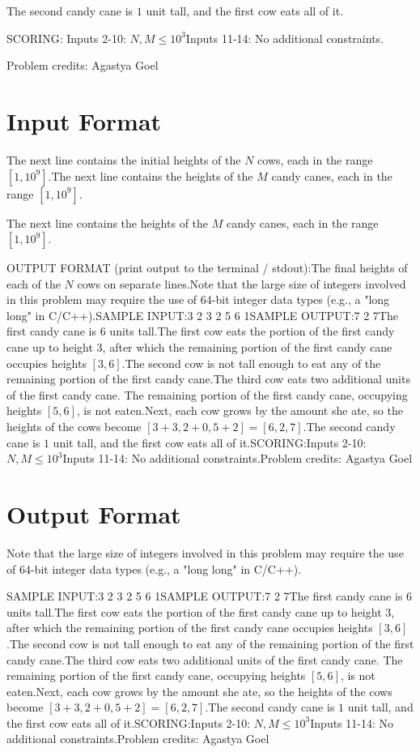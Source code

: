 \documentclass[12pt]{article}
\begin{document}
The second candy cane is $1$ unit tall, and the first cow eats all of it.

SCORING:
Inputs 2-10: $N, M \le 10^3$Inputs 11-14: No additional constraints.


Problem credits: Agastya Goel



\section*{Input Format}
The next line contains the initial heights of the $N$ cows, each in the range
$[1,10^9]$.The next line contains the heights of the $M$ candy canes, each in the range
$[1,10^9]$.

The next line contains the heights of the $M$ candy canes, each in the range
$[1,10^9]$.

OUTPUT FORMAT (print output to the terminal / stdout):The final heights of each of the $N$ cows on separate lines.Note that the large size of integers involved in this problem may require the
use of 64-bit integer data types (e.g., a "long long" in C/C++).SAMPLE INPUT:3 2
3 2 5
6 1SAMPLE OUTPUT:7
2
7The first candy cane is $6$ units tall.The first cow eats the portion of the first candy cane up to height $3$,
after which the remaining portion of the first candy cane occupies heights
$[3,6]$.The second cow is not tall enough to eat any of the remaining portion of the
first candy cane.The third cow eats two additional units of the first candy cane. The
remaining portion of the first candy cane, occupying heights $[5,6]$, is not
eaten.Next, each cow grows by the amount she ate, so the heights of the cows  become
$[3+3, 2+0, 5+2]=[6, 2, 7]$.The second candy cane is $1$ unit tall, and the first cow eats all of it.SCORING:Inputs 2-10: $N, M \le 10^3$Inputs 11-14: No additional constraints.Problem credits: Agastya Goel

\section*{Output Format}
Note that the large size of integers involved in this problem may require the
use of 64-bit integer data types (e.g., a "long long" in C/C++).

SAMPLE INPUT:3 2
3 2 5
6 1SAMPLE OUTPUT:7
2
7The first candy cane is $6$ units tall.The first cow eats the portion of the first candy cane up to height $3$,
after which the remaining portion of the first candy cane occupies heights
$[3,6]$.The second cow is not tall enough to eat any of the remaining portion of the
first candy cane.The third cow eats two additional units of the first candy cane. The
remaining portion of the first candy cane, occupying heights $[5,6]$, is not
eaten.Next, each cow grows by the amount she ate, so the heights of the cows  become
$[3+3, 2+0, 5+2]=[6, 2, 7]$.The second candy cane is $1$ unit tall, and the first cow eats all of it.SCORING:Inputs 2-10: $N, M \le 10^3$Inputs 11-14: No additional constraints.Problem credits: Agastya Goel
\end{document}
